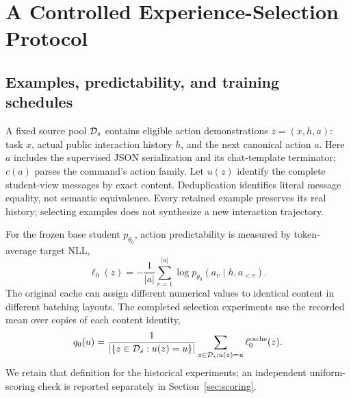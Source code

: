 \section{A Controlled Experience-Selection Protocol}
\label{sec:method}
\subsection{Examples, predictability, and training schedules}
A fixed source pool $\mathcal{D}_s$ contains eligible action demonstrations $z=(x,h,a)$: task $x$, actual public interaction history $h$, and the next canonical action $a$. Here $a$ includes the supervised JSON serialization and its chat-template terminator; $c(a)$ parses the command's action family. Let $u(z)$ identify the complete student-view messages by exact content. Deduplication identifies literal message equality, not semantic equivalence. Every retained example preserves its real history; selecting examples does not synthesize a new interaction trajectory.

For the frozen base student $p_{\theta_0}$, action predictability is measured by token-average target NLL,
\begin{equation}
 \ell_0(z)=-\frac{1}{|a|}\sum_{v=1}^{|a|}
 \log p_{\theta_0}(a_v\mid h,a_{<v}).
 \label{eq:nll}
\end{equation}
The original cache can assign different numerical values to identical content in different batching layouts. The completed selection experiments use the recorded mean over copies of each content identity,
\begin{equation}
 q_0(u)=\frac{1}{|\{z\in\mathcal{D}_s:u(z)=u\}|}
 \sum_{z\in\mathcal{D}_s:u(z)=u}\ell_0^{\mathrm{cache}}(z).
 \label{eq:cache}
\end{equation}
We retain that definition for the historical experiments; an independent uniform-scoring check is reported separately in Section~\ref{sec:scoring}.

